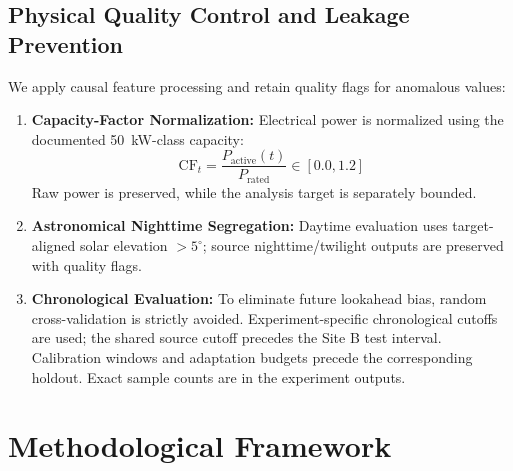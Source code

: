 \documentclass[preprint,12pt,authoryear]{elsarticle}
\begin{document}
\subsection{Physical Quality Control and Leakage Prevention}
We apply causal feature processing and retain quality flags for anomalous values:
\begin{enumerate}
    \item \textbf{Capacity-Factor Normalization:} Electrical power is normalized using the documented 50~kW-class capacity:
    \begin{equation}
        \text{CF}_t = \frac{P_{\text{active}}(t)}{P_{\text{rated}}} \in [0.0, 1.2]
    \end{equation}
    Raw power is preserved, while the analysis target is separately bounded.
    \item \textbf{Astronomical Nighttime Segregation:} Daytime evaluation uses target-aligned solar elevation $>5^\circ$; source nighttime/twilight outputs are preserved with quality flags.
    \item \textbf{Chronological Evaluation:} To eliminate future lookahead bias, random cross-validation is strictly avoided. Experiment-specific chronological cutoffs are used; the shared source cutoff precedes the Site B test interval. Calibration windows and adaptation budgets precede the corresponding holdout. Exact sample counts are in the experiment outputs.
\end{enumerate}

\section{Methodological Framework}
\label{sec:methodology}
\end{document}
